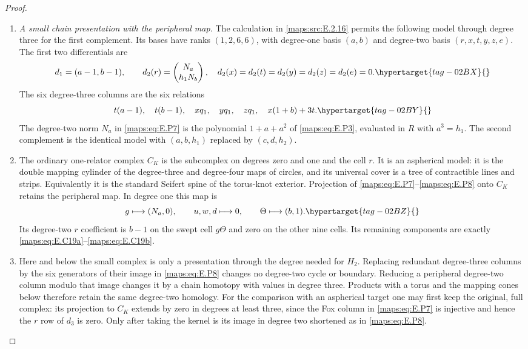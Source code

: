 \documentclass[11pt,a4paper]{article}
\numberwithin{equation}{section}
\theoremstyle{definition}
\newcommand{\h}{\mathfrak h}\newcommand{\hz}{\mathfrak h_z}\newcommand{\Acon}{\mathfrak A}\newcommand{\wt}[1]{\widehat{#1}}
\begin{document}
\begin{proof}
\begin{enumerate}[label=\arabic*.,leftmargin=*]
\item \emph{A small chain presentation with the peripheral map.}
The calculation in \ref{maps:src:E.2.16} permits the following model
through degree three for the first complement. Its
bases have ranks $(1,2,6,6)$, with degree-one basis
$(a,b)$ and degree-two basis $(r,x,t,y,z,e)$.
The first two differentials are
\begin{equation}
 d_1=(a-1,b-1),\qquad
 d_2(r)=\begin{pmatrix}N_a\\h_1N_b\end{pmatrix},
 \quad d_2(x)=d_2(t)=d_2(y)=d_2(z)=d_2(e)=0.
 \hypertarget{tag-02BX}{}\label{maps:eq:E.P7}
\end{equation}
The six degree-three columns are the six relations
\begin{equation}
 t(a-1),\quad t(b-1),\quad xq_1,\quad yq_1,\quad zq_1,
                         \quad x(1+b)+3t.
 \hypertarget{tag-02BY}{}\label{maps:eq:E.P8}
\end{equation}
The degree-two norm $N_a$ in \eqref{maps:eq:E.P7} is the polynomial $1+a+a^2$ of \eqref{maps:eq:E.P3}, evaluated in $R$ with $a^3=h_1$. The second complement is the identical
model with $(a,b,h_1)$ replaced by $(c,d,h_2)$.

\item The ordinary one-relator complex $C_K$ is the subcomplex
on degrees zero and one and the cell $r$. It is an
aspherical model: it is the double mapping cylinder
of the degree-three and degree-four maps of circles,
and its universal cover is a tree of contractible
lines and strips. Equivalently it is the standard
Seifert spine of the torus-knot exterior. Projection
of \eqref{maps:eq:E.P7}--\eqref{maps:eq:E.P8} onto $C_K$ retains the peripheral map. In degree one this map is
\begin{equation}
 g\longmapsto(N_a,0),\qquad
 u,w,d\longmapsto0,\qquad
 \Theta\longmapsto(b,1).
 \hypertarget{tag-02BZ}{}\label{maps:eq:E.P9}
\end{equation}
Its degree-two $r$ coefficient is $b-1$ on the swept
cell $g\Theta$ and zero on the other nine cells.
Its remaining components are exactly \eqref{maps:eq:E.C19a}--\eqref{maps:eq:E.C19b}.
\item Here and below the small complex is only a
presentation through the degree needed for $H_2$.
Replacing redundant degree-three columns by the six
generators of their image in \eqref{maps:eq:E.P8} changes no
degree-two cycle or boundary. Reducing a peripheral
degree-two column modulo that image changes it by
a chain homotopy with values in degree three.
Products with a torus and the mapping cones below
therefore retain the same degree-two homology.
For the comparison with an aspherical target one
may first keep the original, full complex: its
projection to $C_K$ extends by zero in degrees at
least three, since the Fox column in \eqref{maps:eq:E.P7} is
injective and hence the $r$ row of $d_3$ is zero.
Only after taking the kernel is its image in degree
two shortened as in \eqref{maps:eq:E.P8}. 


\end{enumerate}
\end{proof}
\end{document}
